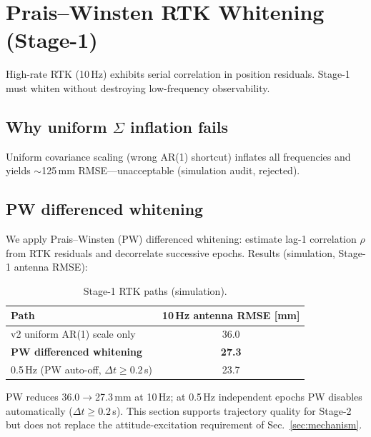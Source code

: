 \section{Prais--Winsten RTK Whitening (Stage-1)}
\label{sec:pw}

High-rate RTK (10\,Hz) exhibits serial correlation in position residuals.
Stage-1 must whiten without destroying low-frequency observability.

\subsection{Why uniform $\Sigma$ inflation fails}
Uniform covariance scaling (wrong AR(1) shortcut) inflates all frequencies and
yields $\sim$125\,mm RMSE---unacceptable (simulation audit, rejected).

\subsection{PW differenced whitening}
We apply Prais--Winsten (PW) differenced whitening: estimate lag-1 correlation
$\rho$ from RTK residuals and decorrelate successive epochs.
Results (simulation, Stage-1 antenna RMSE):

\begin{table}[t]
  \centering
  \caption{Stage-1 RTK paths (simulation).}
  \label{tab:pw}
  \begin{tabular}{lc}
    \toprule
    Path & 10\,Hz antenna RMSE [mm] \\
    \midrule
    v2 uniform AR(1) scale only & 36.0 \\
    \textbf{PW differenced whitening} & \textbf{27.3} \\
    0.5\,Hz (PW auto-off, $\Delta t\geq 0.2$\,s) & 23.7 \\
  \bottomrule
  \end{tabular}
\end{table}

PW reduces 36.0$\to$27.3\,mm at 10\,Hz; at 0.5\,Hz independent epochs PW disables
automatically ($\Delta t\geq 0.2$\,s).
This section supports trajectory quality for Stage-2 but does not replace the
attitude-excitation requirement of Sec.~\ref{sec:mechanism}.
